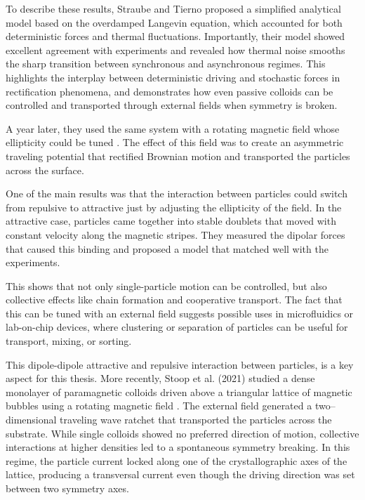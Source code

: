 To describe these results, Straube and Tierno proposed a simplified analytical model based on the overdamped Langevin equation, which accounted for both deterministic forces and thermal fluctuations. Importantly, their model showed excellent agreement with experiments and revealed how thermal noise smooths the sharp transition between synchronous and asynchronous regimes. This highlights the interplay between deterministic driving and stochastic forces in rectification phenomena, and demonstrates how even passive colloids can be controlled and transported through external fields when symmetry is broken.

A year later, they used the same system with a rotating magnetic field whose ellipticity could be tuned \cite{straube2014tunable}. The effect of this field was to create an asymmetric traveling potential that rectified Brownian motion and transported the particles across the surface.

One of the main results was that the interaction between particles could switch from repulsive to attractive just by adjusting the ellipticity of the field. In the attractive case, particles came together into stable doublets that moved with constant velocity along the magnetic stripes. They measured the dipolar forces that caused this binding and proposed a model that matched well with the experiments.

This shows that not only single-particle motion can be controlled, but also collective effects like chain formation and cooperative transport. The fact that this can be tuned with an external field suggests possible uses in microfluidics or lab-on-chip devices, where clustering or separation of particles can be useful for transport, mixing, or sorting.

This dipole-dipole attractive and repulsive interaction between particles, is a key aspect for this thesis. More recently, Stoop et al. (2021) studied a dense monolayer of paramagnetic colloids driven above a triangular lattice of magnetic bubbles using a rotating magnetic field \cite{stoop2020collective}. The external field generated a two–dimensional traveling wave ratchet that transported the particles across the substrate. While single colloids showed no preferred direction of motion, collective interactions at higher densities led to a spontaneous symmetry breaking. In this regime, the particle current locked along one of the crystallographic axes of the lattice, producing a transversal current even though the driving direction was set between two symmetry axes.

